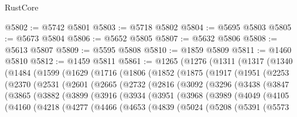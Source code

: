 \begin{lexlean}{RustCore}
\begin{coremodule}
@5802 := @5742 @5801
@5803 := @5718 @5802
@5804 := @5695 @5803
@5805 := @5673 @5804
@5806 := @5652 @5805
@5807 := @5632 @5806
@5808 := @5613 @5807
@5809 := @5595 @5808
@5810 := @1859 @5809
@5811 := @1460 @5810
@5812 := @1459 @5811
@5861 := @1265
    (@1276
      (@1311
        (@1317
          (@1340
            (@1484
              (@1599
                (@1629
                  (@1716
                    (@1806
                      (@1852
                        (@1875
                          (@1917
                            (@1951
                              (@2253
                                (@2370
                                  (@2531
                                    (@2601
                                      (@2665
                                        (@2732
                                          (@2816
                                            (@3092
                                              (@3296
                                                (@3438
                                                  (@3847
                                                    (@3865
                                                      (@3882
                                                        (@3899
                                                          (@3916
                                                            (@3934
                                                              (@3951
                                                                (@3968
                                                                  (@3989
                                                                    (@4049
                                                                      (@4105
                                                                        (@4160
                                                                          (@4218
                                                                            (@4277
                                                                              (@4466
                                                                                (@4653
                                                                                  (@4839
                                                                                    (@5024
                                                                                      (@5208
                                                                                        (@5391
                                                                                          (@5573

\end{coremodule}
\end{lexlean}
